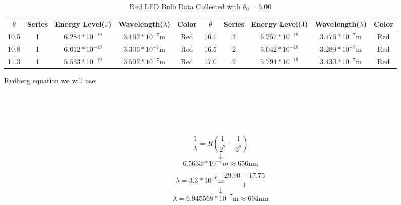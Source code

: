 \documentclass{article}
\begin{document}
    \begin{longtable}[c]{| c c c c c || c c c c c |}
        \caption{Red LED Bulb Data Collected with $\theta_{0} = 5.00$ \label{long}}\\
        \hline
        $\theta$ & Series & Energy Level($\si{\joule}$) & Wavelength($\lambda$) & Color & $\theta$ & Series & Energy Level($\si{\joule}$) & Wavelength($\lambda$) & Color\\
        \hline
        10.5 & 1 & $6.284 * 10^{-19}$ & $3.162 * 10^{-7} \si{\metre}$ & Red & 16.1 & 2 & $6.257 * 10^{-19}$ & $3.176 * 10^{-7} \si{\metre}$ & Red\\
        10.8 & 1 & $6.012 * 10^{-19}$ & $3.306 * 10^{-7} \si{\metre}$ & Red & 16.5 & 2 & $6.042 * 10^{-19}$ & $3.289 * 10^{-7} \si{\metre}$ & Red\\
        11.3 & 1 & $5.533 * 10^{-19}$ & $3.592 * 10^{-7} \si{\metre}$ & Red & 17.0 & 2 & $5.794 * 10^{-19}$ & $3.430 * 10^{-7} \si{\metre}$ & Red\\
        \hline
    \end{longtable}

    Rydberg equation we will use:\\\\\\\\\\\
    $$\dfrac{1}{\lambda} = R(\dfrac{1}{2^{2}} - \dfrac{1}{3^{2}})$$
    $$\downarrow$$
    $$6.5633 * 10^{-7} m \approx 656 \si{\nano\metre}$$


    $$ \lambda = 3.3 * 10^{-6} \si{\metre}  \dfrac{29.90 - 17.75}{1}$$
    $$ \downarrow$$
    $$ \lambda = 6.945568 * 10^{-7} \si{\metre} \approx 694 \si{\nano\metre}$$
\end{document}
